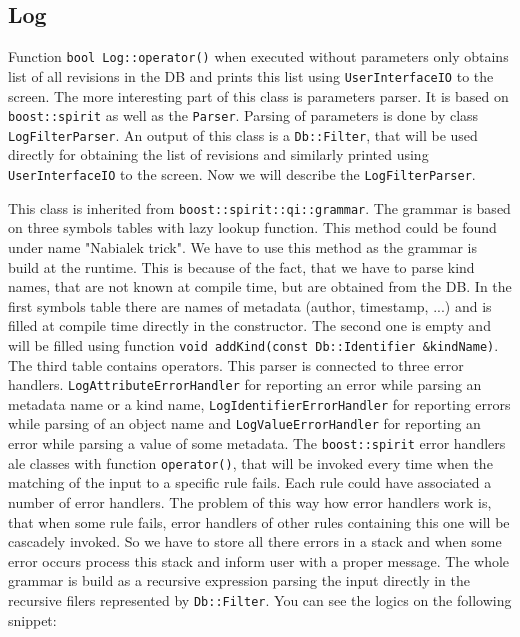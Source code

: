 \documentclass[deska]{subfiles}
\begin{document}
\subsection{Log}

Function {\tt bool Log::operator()} when executed without parameters only obtains list of all revisions in the DB and
prints this list using {\tt UserInterfaceIO} to the screen. The more interesting part of this class is parameters parser.
It is based on {\tt boost::spirit} as well as the {\tt Parser}. Parsing of parameters is done by class {\tt LogFilterParser}.
An output of this class is a {\tt Db::Filter}, that will be used directly for obtaining the list of revisions and similarly
printed using {\tt UserInterfaceIO} to the screen. Now we will describe the {\tt LogFilterParser}.

This class is inherited from {\tt boost::spirit::qi::grammar}. The grammar is based on three symbols tables with lazy lookup
function. This method could be found under name "Nabialek trick". We have to use this method as the grammar is build at
the runtime. This is because of the fact, that we have to parse kind names, that are not known at compile time, but are obtained
from the DB. In the first symbols table there are names of metadata (author, timestamp, ...) and is filled at compile time
directly in the constructor. The second one is empty and will be filled using function {\tt void addKind(const Db::Identifier \&kindName)}.
The third table contains operators. This parser is connected to three error handlers. {\tt LogAttributeErrorHandler}
for reporting an error while parsing an metadata name or a kind name, {\tt LogIdentifierErrorHandler} for reporting errors
while parsing of an object name and {\tt LogValueErrorHandler} for reporting an error while parsing a value of some
metadata. The {\tt boost::spirit} error handlers ale classes with function {\tt operator()}, that will be invoked every time
when the matching of the input to a specific rule fails. Each rule could have associated a number of error handlers. The
problem of this way how error handlers work is, that when some rule fails, error handlers of other rules containing this one
will be cascadely invoked. So we have to store all there errors in a stack and when some error occurs process this stack
and inform user with a proper message. The whole grammar is build as a recursive expression parsing the input directly in the
recursive filers represented by {\tt Db::Filter}. You can see the logics on the following snippet:
\end{document}

